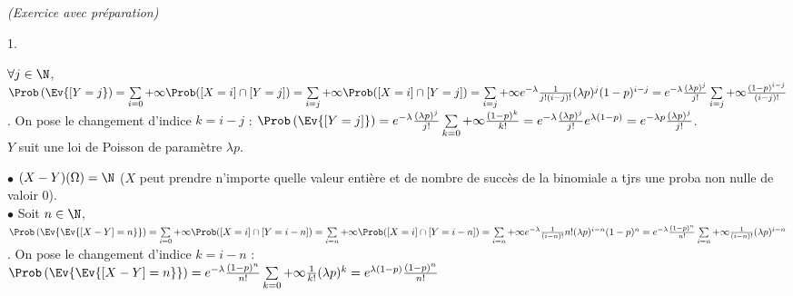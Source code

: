 \documentclass[11pt]{article}%
\begin{document}
\begin{exercice}{\it (Exercice avec préparation)}
\begin{noliste}{1.}
\item $\forall j \in \N$, $\Prob\left(\Ev{[Y = j}\right) = \sum
  \limits_{i = 0}{+ \infty} \Prob([X = i] \cap [Y = j]) = \sum
  \limits_{i = j}{+ \infty} \Prob([X = i] \cap [Y = j]) = \sum
  \limits_{i = j}{+ \infty} e^{-\lambda} \frac{1}{j!(i-j)!}(\lambda
  p)^{j} (1-p)^{i-j} = e^{-\lambda} \frac{(\lambda p)^{j}}{j!} \sum
  \limits_{i = j}{+ \infty} \frac{(1-p)^{i-j }}{(i-j)!}$. On pose le
  changement d'indice $k = i-j$ : $\Prob\left(\Ev{[Y = j]}\right) =
  e^{-\lambda} \frac{(\lambda p)^{j}}{j!} \sum \limits_{k = 0}{+
    \infty} \frac{(1-p)^{k }}{k!} = e^{-\lambda} \frac{(\lambda
    p)^{j}}{j!} e^{\lambda(1-p)} = e^{-\lambda
    p} \frac{(\lambda p)^{j}}{j!}$.\\
  $Y$ suit une loi de Poisson de paramètre $\lambda p$.
 \item $\bullet$ $(X-Y)(\Omega) = \N$ ($X$ peut prendre n'importe
quelle valeur entière et de nombre de succès de la binomiale a tjrs une
proba non nulle de valoir 0). \\
 $\bullet$ Soit $n \in \N$, $\Prob\left(\Ev{\Ev{[X-Y] = n}}\right) =
\sum \limits_{i = 0}{+ \infty} \Prob([X = i] \cap [Y = i-n]) = \sum
\limits_{i = n}{+ \infty} \Prob([X = i] \cap [Y = i-n]) = \sum
\limits_{i = n}{+ \infty}e^{-\lambda} \frac{1}{(i-n)!}{n!}(\lambda
p)^{i-n}(1-p)^{n} = e^{-\lambda}\frac{(1-p)^{n}}{n!}\sum \limits_{i =
n}{+ \infty} \frac{1}{(i-n)!}(\lambda p)^{i-n}$. On pose le changement
d'indice $k = i-n$ : \\
 $\Prob\left(\Ev{\Ev{[X-Y] = n}}\right) =
e^{-\lambda}\frac{(1-p)^{n}}{n!}\sum \limits_{k = 0}{+ \infty}
\frac{1}{k!}(\lambda p)^{k} = e^{\lambda(1-p)}\frac{(1-p)^{n}}{n!}$


\end{noliste}
\end{exercice}
\end{document}
